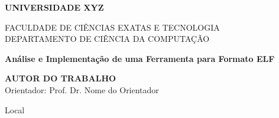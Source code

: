 \thispagestyle{empty}
\begin{center}
    \vspace*{2cm}
    
    \Large
    \textbf{UNIVERSIDADE XYZ}
    
    \vspace{1cm}
    
    \large
    FACULDADE DE CIÊNCIAS EXATAS E TECNOLOGIA\\
    DEPARTAMENTO DE CIÊNCIA DA COMPUTAÇÃO
    
    \vspace{4cm}
    
    \Huge
    \textbf{Análise e Implementação de uma Ferramenta para Formato ELF}
    
    \vspace{3cm}
    
    \large
    \textbf{AUTOR DO TRABALHO}\\
    \vspace{0.5cm}
    Orientador: Prof. Dr. Nome do Orientador
    
    \vfill
    
    Local\\
    \the\year
\end{center}
\clearpage